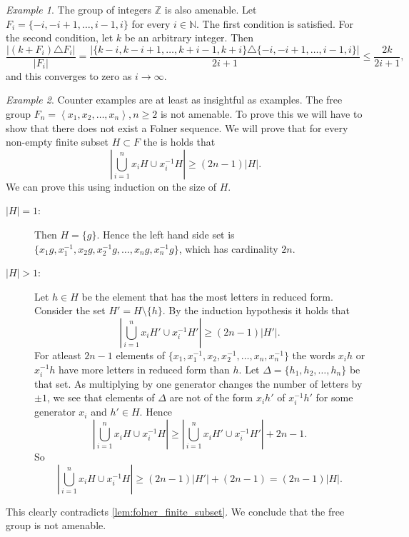 \documentclass[titlepage, a4paper]{article}
\newcommand{\N}{\mathbb{N}}
\newcommand{\Z}{\mathbb{Z}}
\newcommand{\card}[1]{\left| #1 \right|}
\theoremstyle{remark}
\newtheorem{example}{Example}
\begin{document}
\begin{example}\label{ex:integers_folner}
    The group of integers $\Z$ is also amenable. Let $F_i = \{-i, -i+1, \dots, i-1, i\}$ for every $i \in \N$. The first condition is satisfied. For the second condition, let $k$ be an arbitrary integer. Then
    \[
        \frac{\card{(k + F_i) \triangle F_i}}{\card{F_i}}
        = \frac{\card{\{k-i, k-i+1, \dots, k+i-1, k+i\}\triangle \{-i, -i+1, \dots, i-1, i\}}}{2i+1}
        \leq \frac{2k}{2i+1},
    \]
    and this converges to zero as $i \to \infty$.
\end{example}

\begin{example}
	Counter examples are at least as insightful as examples. 
	The free group $F_n = \left<x_1, x_2, \ldots, x_n \right>, n \ge 2$ is not amenable. 
	To prove this we will have to show that there does not exist a Folner sequence.
	We will prove that for every non-empty finite subset $H \subset F$ the is holds that \[
		\card{\bigcup_{i = 1}^{n} x_iH \cup x_i^{-1}H} \ge (2n-1) \card{H}
	.\] 
	We can prove this using induction on the size of $H$. 
	\begin{description}
		\item[$\card{H} = 1$:] Then $H = \{g\}$. 
			Hence the left hand side set is $\{x_1g, x_1^{-1}, x_2g, x_2^{-1}g, \ldots, x_ng, x_n^{-1}g\} $, which has cardinality $2n$. 
		\item[$\card{H} > 1$:] 
			Let $ h \in H$ be the element that has the most letters in reduced form.
			Consider the set $H' = H\setminus \{h\} $. 
			By the induction hypothesis it holds that
			\[	
				\card{\bigcup_{i = 1}^{n} x_iH' \cup x_i^{-1}H'} \ge (2n-1) \card{H'}
			.\] 
			For atleast $2n-1$ elements of $\{x_1,x_1^{-1},x_2,x_2^{-1},\ldots, x_n, x_n^{-1}\} $ the words $x_ih$ or  $x_i^{-1}h$ have more letters in reduced form than $h$. Let $\Delta = \{ h_1, h_2, \ldots, h_n\} $ be that set.  
			As multiplying by one generator changes the number of letters by $\pm 1$, we see that elements of $\Delta$ are not of the form $x_ih'$ of $x_i^{-1}h'$ for some generator $x_i$ and $h' \in H$. 
			Hence \[
				\card{\bigcup_{i = 1}^{n} x_iH \cup x_i^{-1}H}  \ge \card{\bigcup_{i = 1}^{n} x_iH' \cup x_i^{-1}H'} + 2n-1
 			.\]
			So \[
				\card{\bigcup_{i = 1}^{n} x_iH \cup x_i^{-1}H} \ge (2n-1)\card{H'} + (2n-1) = (2n-1 ) \card{H}
			.\]
	\end{description}
	This clearly contradicts \cref{lem:folner_finite_subset}. 
	We conclude that the free group is not amenable. 
\end{example}
\end{document}
